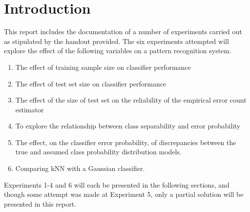 \section{Introduction}\label{s:intro}
This report includes the documentation of a number of experiments carried out as stipulated by the handout provided. The six experiments attempted will explore the effect of the following variables on a pattern recognition system.

\begin{enumerate}
	\item The effect of training sample size on classifier performance
	\item The effect of test set size on classifier performance
	\item The effect of the size of test set on the reliability of the empirical error count estimator
	\item To explore the relationship between class separability and error probability
	\item The effect, on the classifier error probability, of discrepancies between the true and assumed class probability distribution models.
	\item Comparing kNN with a Gaussian classifier.
\end{enumerate}

Experiments 1-4 and 6 will each be presented in the following sections, and though some attempt was made at Experiment 5, only a partial solution will be presented in this report.

%
